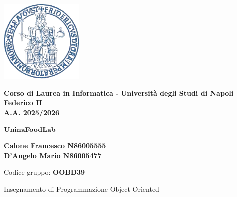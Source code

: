 \documentclass{article}
\begin{document}
\thispagestyle{firstpage}


\begin{center}
    \includegraphics[width=0.3\textwidth]{latex/immagini/uni_logo.png} 
    \vspace{0.5cm}

    {\large \textbf{Corso di Laurea in Informatica - Università degli Studi di Napoli Federico II}}\\
    {\large \textbf{A.A. 2025/2026}}\\[1cm]
    \vspace{1cm}

    {\Huge \color{myblue} \textbf{UninaFoodLab}}\\[2cm]

    \begin{flushleft}
    \centering
    {\large
    \textbf{Calone Francesco N86005555}\\
    \vspace{0.2cm}
    \textbf{D'Angelo Mario N86005477}\\
    }
    
    \vspace{0.2cm}
    {\small Codice gruppo: \textbf{OOBD39}}\\
    \vspace{0.8cm} 

    {\small Insegnamento di Programmazione Object-Oriented}
    \end{flushleft}
\end{center}


\newpage

\pagestyle{normal}

\tableofcontents
\thispagestyle{normal}










\end{document}
